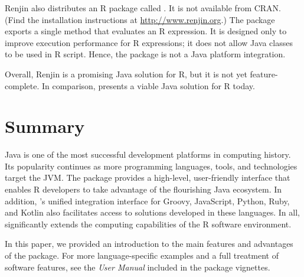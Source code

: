 Renjin also distributes an R package called . It is not available from CRAN. (Find the installation instructions at \url{http://www.renjin.org}.) The  package exports a single method that evaluates an R expression. It is designed only to improve execution performance for R expressions; it does not allow Java classes to be used in R script. Hence, the  package is not a Java platform integration.

Overall, Renjin is a promising Java solution for R, but it is not yet feature-complete. In comparison,  presents a viable Java solution for R today.

\section{Summary}

Java is one of the most successful development platforms in computing history. Its popularity continues as more programming languages, tools, and technologies target the JVM. The  package provides a high-level, user-friendly interface that enables R developers to take advantage of the flourishing Java ecosystem. In addition, 's unified integration interface for Groovy, JavaScript, Python, Ruby, and Kotlin also facilitates access to solutions developed in these languages. In all,  significantly extends the computing capabilities of the R software environment.

In this paper, we provided an introduction to the main features and advantages of the  package. For more language-specific examples and a full treatment of software features, see the \textit{ User Manual} included in the package vignettes.



\address{Floid R. Gilbert\\
    Master's Student\\
    Department of Statistics\\
    Brigham Young University\\
    Provo, UT 84602\\
    USA\\}

\address{David B. Dahl\\
    Professor, Graduate Coordinator, and Associate Chair\\
    Department of Statistics\\
    Brigham Young University\\
    Provo, UT 84602\\
    USA\\}

